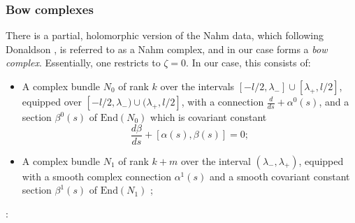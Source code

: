 \documentclass[12pt]{article}
\theoremstyle{definition}
\theoremstyle{remark}
\numberwithin{theorem}{section}
\begin{document}
\subsubsection{Bow complexes}  \label{Bow-complexes}

There is a partial, holomorphic version of the Nahm data, which following Donaldson \cite{Donaldson:1985id},
is referred to as a Nahm complex, and in our case forms a {\em bow complex}. Essentially, one restricts to $\zeta = 0$. In our case, this consists of:
\medskip


 \begin{itemize}
\item A complex  bundle $N_0$ of rank $k$ over the intervals $[-l/2,  \lambda_-]\cup [\lambda_+, l/2]$, equipped over
$[-l/2,  \lambda_-)\cup (\lambda_+, l/2]$,  with a connection 
$ \frac{d}{ds} + \alpha^0(s)$, and a section $\beta^0(s)$ of $\mathrm{End}(N_0)$ which is covariant constant 
$$\frac{d\beta}{ds} + [\alpha(s),\beta(s)] = 0;$$
\item A complex bundle $N_1$ of rank $k+m$ over the interval
$(\lambda_-, \lambda_+)$, equipped with a smooth complex connection
$\alpha^{1}(s)$  and a smooth covariant constant section
$\beta^{1}(s)$ of $\mathrm{End}(N_1)$ ; \end{itemize}
\bigskip

\medskip

:
\medskip
\end{document}
